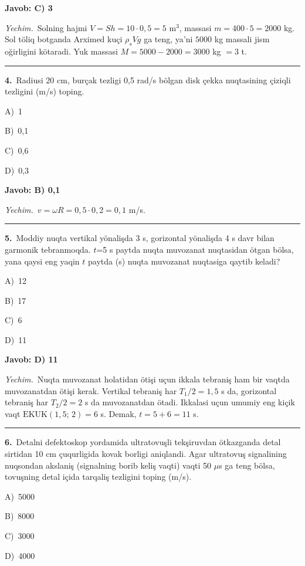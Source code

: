 \documentclass[11pt,a4paper]{article}
\newcommand{\opt}[2]{\hspace*{4mm}#1)\ #2\par}
\begin{document}
\noindent\colorbox{gray!12}{\parbox{\dimexpr\linewidth-2\fboxsep}{\textbf{Javob: C) 3}}}\par\smallskip
\noindent\textit{Yechim.}\ Solning hajmi $V=Sh=10\cdot0{,}5=5$ m$^3$, massasi $m=400\cdot5=2000$ kg. Sol töliq botganda Arximed kuçi $\rho_s Vg$ ga teng, ya’ni $5000$ kg massali jism oğirligini kötaradi. Yuk massasi $M=5000-2000=3000$ kg $=3$ t.\par\par\medskip\hrule\medskip
{}\noindent\begin{minipage}{\linewidth}
\textbf{4.}\ Radiusi 20 cm, burçak tezligi 0,5 rad/s bölgan disk çekka nuqtasining çiziqli tezligini (m/s) toping.\par\smallskip
\opt{A}{1}
\opt{B}{0,1}
\opt{C}{0,6}
\opt{D}{0,3}
\end{minipage}\vspace{2pt}\par
\noindent\colorbox{gray!12}{\parbox{\dimexpr\linewidth-2\fboxsep}{\textbf{Javob: B) 0,1}}}\par\smallskip
\noindent\textit{Yechim.}\ $v=\omega R=0{,}5\cdot0{,}2=0{,}1$ m/s.\par\par\medskip\hrule\medskip
{}\noindent\begin{minipage}{\linewidth}
\textbf{5.}\ Moddiy nuqta vertikal yönalişda 3 s, gorizontal yönalişda 4 s davr bilan garmonik tebranmoqda. $t$=5 s paytda nuqta muvozanat nuqtasidan ötgan bölsa, yana qaysi eng yaqin $t$ paytda (s) nuqta muvozanat nuqtasiga qaytib keladi?\par\smallskip
\opt{A}{12}
\opt{B}{17}
\opt{C}{6}
\opt{D}{11}
\end{minipage}\vspace{2pt}\par
\noindent\colorbox{gray!12}{\parbox{\dimexpr\linewidth-2\fboxsep}{\textbf{Javob: D) 11}}}\par\smallskip
\noindent\textit{Yechim.}\ Nuqta muvozanat holatidan ötişi uçun ikkala tebraniş ham bir vaqtda muvozanatdan ötişi kerak. Vertikal tebraniş har $T_1/2=1{,}5$ s da, gorizontal tebraniş har $T_2/2=2$ s da muvozanatdan ötadi. Ikkalasi uçun umumiy eng kiçik vaqt $\mathrm{EKUK}(1{,}5;\,2)=6$ s. Demak, $t=5+6=11$ s.\par\par\medskip\hrule\medskip
{}\noindent\begin{minipage}{\linewidth}
\textbf{6.}\ Detalni defektoskop yordamida ultratovuşli tekşiruvdan ötkazganda detal sirtidan 10 cm çuqurligida kovak borligi aniqlandi. Agar ultratovuş signalining nuqsondan akslaniş (signalning borib keliş vaqti) vaqti 50 $\mu$s ga teng bölsa, tovuşning detal içida tarqaliş tezligini toping (m/s).\par\smallskip
\opt{A}{5000}
\opt{B}{8000}
\opt{C}{3000}
\opt{D}{4000}
\end{minipage}\vspace{2pt}\par
\end{document}
